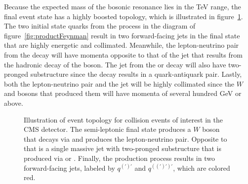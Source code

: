 Because the expected mass of the bosonic resonance lies in the TeV range, the final event state has a highly boosted topology, which is illustrated in figure~\ref{fig:eventTop}.
The two initial state quarks from the \VBF process in the diagram of figure~\ref{fig:productFeynman} result in two forward-facing jets in the final state that are highly energetic and collimated.
Meanwhile, the lepton-neutrino pair from the \Wtolnu decay will have momenta opposite to that of the jet that results from the hadronic decay of the \VorH boson.
The jet from the \Vtoqqbarpr or \Htobbbar decay will also have two-pronged substructure since the decay results in a quark-antiquark pair.
Lastly, both the lepton-neutrino pair and the jet will be highly collimated since the $W$ and \VorH bosons that produced them will have momenta of several hundred GeV or above.

\begin{figure}[htbp]
  \centering
  
  \caption{
    Illustration of event topology for collision events of interest in the CMS detector.
    The semi-leptonic final state produces a $W$ boson that decays via \Wtolnu and produces the lepton-neutrino pair.
    Opposite to that is a single massive jet with two-pronged substructure that is produced via \Vtoqqbarpr or \Htobbbar.
    Finally, the \VBF production process results in two forward-facing jets, labeled by $q^{(\prime)\prime}$ and $q^{((\prime)\prime)\prime}$, which are colored red.
  }
  \label{fig:eventTop}
\end{figure}
